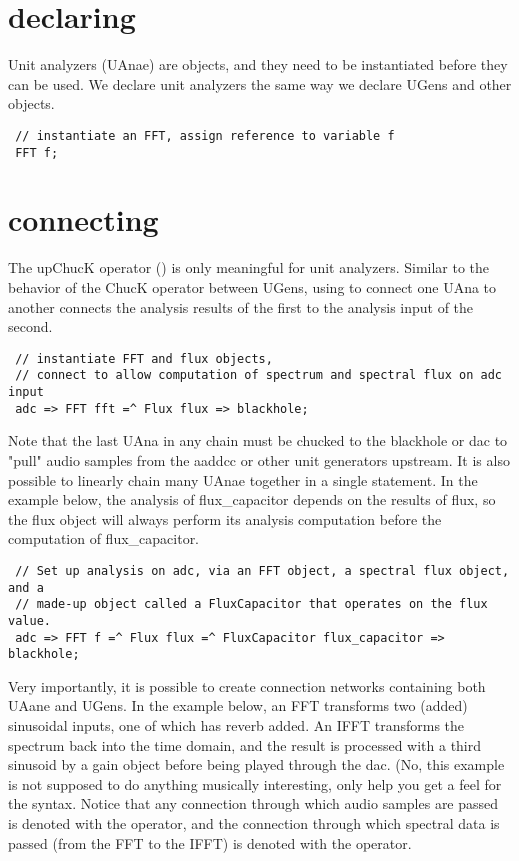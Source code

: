 \section{declaring} 
Unit analyzers (UAnae) are objects, and they need to be instantiated before
they can be used. We declare unit analyzers the same way we declare UGens and
other objects.
\begin{verbatim}
 // instantiate an FFT, assign reference to variable f
 FFT f;
\end{verbatim}
\section{connecting} 
The upChucK operator (\upchuckop) is only meaningful for unit analyzers. Similar to the
behavior of the ChucK operator between UGens, using \upchuckop to connect one UAna to
another connects the analysis results of the first to the analysis input of the
second. 
\begin{verbatim}
 // instantiate FFT and flux objects,
 // connect to allow computation of spectrum and spectral flux on adc input
 adc => FFT fft =^ Flux flux => blackhole;
\end{verbatim}
Note that the last UAna in any chain must be chucked to the blackhole or dac to
"pull" audio samples from the aaddcc or other unit generators upstream.
It is also possible to linearly chain many UAnae together in a single
statement. In the example below, the 
analysis of flux\_capacitor depends on the results of flux, so the flux object
will always perform its analysis computation before the computation
of flux\_capacitor.
\begin{verbatim}
 // Set up analysis on adc, via an FFT object, a spectral flux object, and a
 // made-up object called a FluxCapacitor that operates on the flux value.
 adc => FFT f =^ Flux flux =^ FluxCapacitor flux_capacitor => blackhole;
\end{verbatim}
Very importantly, it is possible to create connection networks containing both
UAane and UGens. In the example below, an FFT transforms two (added) sinusoidal
inputs, one of which has reverb added. An IFFT transforms the spectrum back
into the time domain, and the result is processed with a third sinusoid by a
gain object before being played through the dac. (No, this example is not
supposed to do anything musically interesting, only help you get a feel for the
syntax. Notice that any connection through which audio samples are passed is
denoted with the \chuckop operator, and the connection through which spectral data is
passed (from the FFT to the IFFT) is denoted with the \upchuckop operator.

